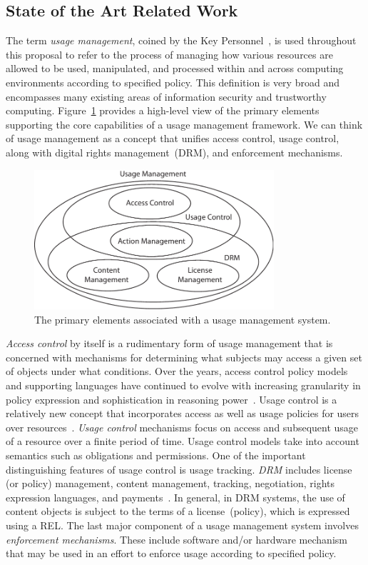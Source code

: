 \documentclass{sbir}
\begin{document}
\subsection{State of the Art Related Work}
The term \emph{usage management}, coined by the Key Personnel~\cite{JaHeLa:10}, is used throughout this proposal to refer to the process of managing how various resources are allowed to be used, manipulated, and processed within and across computing environments according to specified policy. This definition is very broad and encompasses many existing areas of information security and trustworthy computing. Figure~\ref{UM} provides a high-level view of the primary elements supporting the core capabilities of a usage management framework. We can think of usage management as a concept that unifies access control, usage control, along with digital rights management~(DRM), and enforcement mechanisms.
\begin{figure}
  \centerline{\includegraphics[width=3.5in]{./images/usage_management.pdf}}
  \caption{The primary elements associated with a usage management system.}\label{UM}
\end{figure}

\emph{Access control} by itself is a rudimentary form of usage management that is concerned with mechanisms for determining what subjects may access a given set of objects under what conditions. Over the years, access control policy models and supporting languages have continued to evolve with increasing granularity in policy expression and sophistication in reasoning power~\cite{BlPa:76,HuFeKu:06}. Usage control is a relatively new concept that incorporates access as well as usage policies for users over resources~\cite{PaSa:04}. \emph{Usage control} mechanisms focus on access and subsequent usage of a resource over a finite period of time. Usage control models take into account semantics such as obligations and permissions. One of the important distinguishing features of usage control is usage tracking. \emph{DRM} includes license (or policy) management, content management, tracking, negotiation, rights expression languages, and payments~\cite{HeJaKhHr:07,JaHe:08b,JaHeMa:06}. In general, in DRM systems, the use of content objects is subject to the terms of a license~(policy), which is expressed using a REL. The last major component of a usage management system involves \emph{enforcement mechanisms}. These include software and/or hardware mechanism that may be used in an effort to enforce usage according to specified policy.
\end{document}
